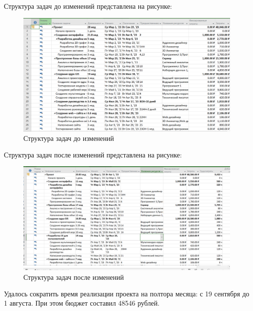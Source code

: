 Структура задач до изменений представлена на рисунке:
\FloatBarrier
\begin{figure}[h]	
	\begin{center}
		\includegraphics[width=\linewidth]{inc/before.png}
	\end{center}
	\captionsetup{justification=centering}
	\caption{Структура задач до изменений}
\end{figure}
\FloatBarrier 

Структура задач после изменений представлена на рисунке:
\FloatBarrier
\begin{figure}[h]	
	\begin{center}
		\includegraphics[width=\linewidth]{inc/after.png}
	\end{center}
	\captionsetup{justification=centering}
	\caption{Структура задач после изменений}
\end{figure}
\FloatBarrier 

Удалось сократить время реализации проекта на полтора месяца: с 19 сентября до 1 августа.
При этом бюджет составил 48546 рублей.

